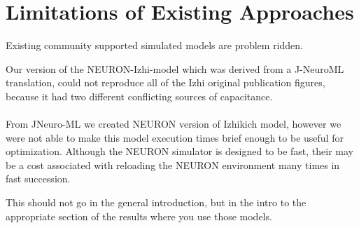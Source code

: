 \section{Limitations of Existing Approaches} 
Existing community supported simulated models are problem ridden.


Our version of the NEURON-Izhi-model which was derived from a J-NeuroML translation, could not reproduce all of the Izhi original publication figures, because it had two different conflicting sources of capacitance.\\
\\
From JNeuro-ML we created NEURON version of Izhikich model, however we were not able to make this model execution times brief enough to be useful for optimization. Although the NEURON simulator is designed to be fast, their may be a cost associated with reloading the NEURON environment many times in fast succession.

This should not go in the general introduction, but in the intro to the appropriate section of the results where you use those models.